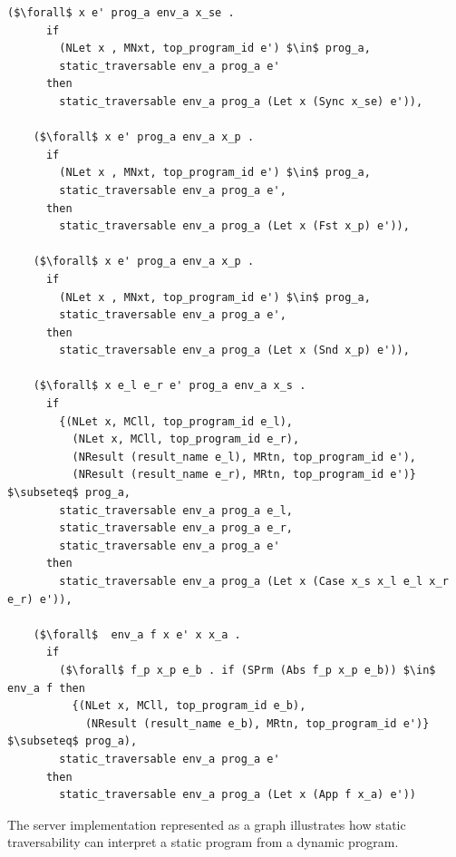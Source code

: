 \documentclass{article}
\begin{document}
\begin{lstlisting}[language=logic, mathescape]
    ($\forall$ x e' prog_a env_a x_se .
      if
        (NLet x , MNxt, top_program_id e') $\in$ prog_a, 
        static_traversable env_a prog_a e'
      then
        static_traversable env_a prog_a (Let x (Sync x_se) e')),

    ($\forall$ x e' prog_a env_a x_p .
      if
        (NLet x , MNxt, top_program_id e') $\in$ prog_a, 
        static_traversable env_a prog_a e', 
      then
        static_traversable env_a prog_a (Let x (Fst x_p) e')),

    ($\forall$ x e' prog_a env_a x_p .
      if
        (NLet x , MNxt, top_program_id e') $\in$ prog_a, 
        static_traversable env_a prog_a e', 
      then
        static_traversable env_a prog_a (Let x (Snd x_p) e')),

    ($\forall$ x e_l e_r e' prog_a env_a x_s .
      if
        {(NLet x, MCll, top_program_id e_l),
          (NLet x, MCll, top_program_id e_r),
          (NResult (result_name e_l), MRtn, top_program_id e'),
          (NResult (result_name e_r), MRtn, top_program_id e')} $\subseteq$ prog_a, 
        static_traversable env_a prog_a e_l, 
        static_traversable env_a prog_a e_r,
        static_traversable env_a prog_a e'
      then
        static_traversable env_a prog_a (Let x (Case x_s x_l e_l x_r e_r) e')),

    ($\forall$  env_a f x e' x x_a .
      if
        ($\forall$ f_p x_p e_b . if (SPrm (Abs f_p x_p e_b)) $\in$ env_a f then 
          {(NLet x, MCll, top_program_id e_b),
            (NResult (result_name e_b), MRtn, top_program_id e')} $\subseteq$ prog_a),
        static_traversable env_a prog_a e'
      then
        static_traversable env_a prog_a (Let x (App f x_a) e'))
  \end{lstlisting}

The server implementation represented as a graph illustrates how static traversability can interpret
a static program from a dynamic program.
\end{document}
